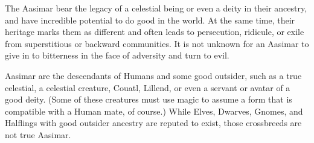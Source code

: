 
The Aasimar bear the legacy of a celestial being or even a deity in their ancestry, and have incredible potential to do good in the world. At the same time, their heritage marks them as different and often leads to persecution, ridicule, or exile from superstitious or backward communities. It is not unknown for an Aasimar to give in to bitterness in the face of adversity and turn to evil.

Aasimar are the descendants of Humans and some good outsider, such as a true celestial, a celestial creature, Couatl, Lillend, or even a servant or avatar of a good deity. (Some of these creatures must use magic to assume a form that is compatible with a Human mate, of course.) While Elves, Dwarves, Gnomes, and Halflings with good outsider ancestry are reputed to exist, those crossbreeds are not true Aasimar.

